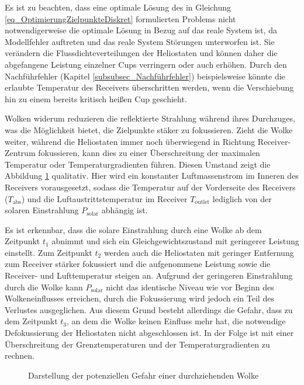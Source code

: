 Es ist zu beachten, dass eine optimale Lösung des in Gleichung \ref{eq_OptimierungZielpunkteDiskret} formulierten Problems nicht notwendigerweise die optimale Lösung in Bezug auf das reale System ist, da Modellfehler auftreten und das reale System Störungen unterworfen ist.
Sie verändern die Flussdichteverteilungen der Heliostaten und können daher die abgefangene Leistung einzelner Cups verringern oder auch erhöhen.
Durch den Nachführfehler (Kapitel \ref{subsubsec_Nachführfehler}) beispielsweise könnte die erlaubte Temperatur des Receivers überschritten werden, wenn die Verschiebung hin zu einem bereits kritisch heißen Cup geschieht. \cite[S.16]{DissZanger}

Wolken widerum reduzieren die reflektierte Strahlung während ihres Durchzuges, was die Möglichkeit bietet, die Zielpunkte stäker zu fokussieren.
Zieht die Wolke weiter, während die Heliostaten immer noch überwiegend in Richtung Receiver-Zentrum fokussieren, kann dies zu einer Überschreitung der maximalen Temperatur oder Temperaturgradienten führen.
Diesen Umstand zeigt die Abbildung \ref{fig_EinflussWolke} qualitativ.
Hier wird ein konstanter Luftmassenstrom im Inneren des Receivers vorausgesetzt, sodass die Temperatur auf der Vorderseite des Receivers ($T_{\mathrm{abs}}$) und die Luftaustrittstemperatur im Receiver $T_{\mathrm{outlet}}$ lediglich von der solaren Einstrahlung $P_{\mathrm{solar}}$ abhängig ist.

Es ist erkennbar, dass die solare Einstrahlung durch eine Wolke ab dem Zeitpunkt $t_1$ abnimmt und sich ein Gleichgewichtszustand mit geringerer Leistung einstellt.
Zum Zeitpunkt $t_2$ werden auch die Heliostaten mit geringer Entfernung zum Receiver stärker fokussiert und die aufgenommene Leistung sowie die Receiver- und Lufttemperatur steigen an.
Aufgrund der geringeren Einstrahlung durch die Wolke kann $P_{\mathrm{solar}}$ nicht das identische Niveau wie vor Beginn des Wolkeneinflusses erreichen, durch die Fokussierung wird jedoch ein Teil des Verlustes ausgeglichen.
Aus diesem Grund besteht allerdings die Gefahr, dass zu dem Zeitpunkt $t_3$, an dem die Wolke keinen Einfluss mehr hat, die notwendige Defokussierung der Heliostaten nicht abgeschlossen ist.
In der Folge ist mit einer Überschreitung der Grenztemperaturen und der Temperaturgradienten zu rechnen.

\begin{figure}[h!]
    \centering
    \setlength{\fboxsep}{1pt}
    \setlength{\fboxrule}{1pt}
    \caption[Darstellung der potenziellen Gefahr einer durchziehenden Wolke]{Darstellung der potenziellen Gefahr einer durchziehenden Wolke}
    \label{fig_EinflussWolke}
\end{figure}

